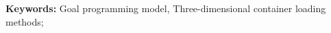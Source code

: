 \MinParskip{}



\textbf{Keywords:} Goal programming model, Three-dimensional container loading methods; 